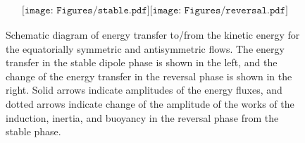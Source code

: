 \begin{figure}[ht]
\begin{center}
\[
\begin{array}{cc}
\texttt{[image: Figures/stable.pdf]}
\texttt{[image: Figures/reversal.pdf]}
\end{array}
\]
\end{center}
\caption{
Schematic diagram of energy transfer to/from the kinetic energy for the equatorially symmetric and antisymmetric flows.
The energy transfer in the stable dipole phase is shown in the left, and the change of the energy transfer in the reversal phase is shown in the right. 
Solid arrows indicate amplitudes of the energy fluxes, and dotted arrows indicate change of the amplitude of the works of the induction, inertia, and buoyancy in the reversal phase from the stable phase.
}
\label{Fig:schematic_reversal}
\end{figure}
